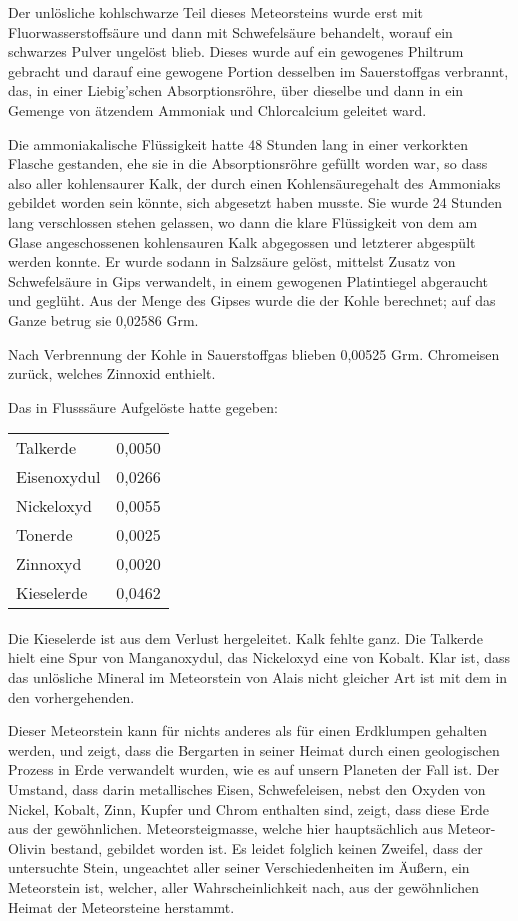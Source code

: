 \documentclass[a4paper, 11pt, oneside]{article}
\begin{document}
Der unlösliche kohlschwarze Teil dieses Meteorsteins wurde erst mit Fluorwasserstoffsäure und dann mit Schwefelsäure behandelt, worauf ein schwarzes Pulver ungelöst blieb. Dieses wurde auf ein gewogenes Philtrum gebracht und darauf eine gewogene Portion desselben im Sauerstoffgas verbrannt, das, in einer Liebig'schen Absorptionsröhre, über dieselbe und dann in ein Gemenge von ätzendem Ammoniak und Chlorcalcium geleitet ward.

Die ammoniakalische Flüssigkeit hatte 48 Stunden lang in einer verkorkten Flasche gestanden, ehe sie in die Absorptionsröhre gefüllt worden war, so dass also aller kohlensaurer Kalk, der durch einen Kohlensäuregehalt des Ammoniaks gebildet worden sein könnte, sich abgesetzt haben musste. Sie wurde 24 Stunden lang verschlossen stehen gelassen, wo dann die klare Flüssigkeit von dem am Glase angeschossenen kohlensauren Kalk abgegossen und letzterer abgespült werden konnte. Er wurde sodann in Salzsäure gelöst, mittelst Zusatz von Schwefelsäure in Gips verwandelt, in einem gewogenen Platintiegel abgeraucht und geglüht. Aus der Menge des Gipses wurde die der Kohle berechnet; auf das Ganze betrug sie 0,02586 Grm.

Nach Verbrennung der Kohle in Sauerstoffgas blieben 0,00525 Grm. Chromeisen zurück, welches Zinnoxid enthielt.

Das in Flusssäure Aufgelöste hatte gegeben:
\begin{center}
\begin{tabular}{ l r }
    Talkerde & 0,0050\\
    Eisenoxydul & 0,0266\\
    Nickeloxyd & 0,0055\\
    Tonerde & 0,0025\\
    Zinnoxyd & 0,0020\\
    Kieselerde & 0,0462\\
\end{tabular}
\end{center}
\paragraph{}
Die Kieselerde ist aus dem Verlust hergeleitet. Kalk fehlte ganz. Die Talkerde hielt eine Spur von Manganoxydul, das Nickeloxyd eine von Kobalt. Klar ist, dass das unlösliche Mineral im Meteorstein von Alais nicht gleicher Art ist mit dem in den vorhergehenden.

Dieser Meteorstein kann für nichts anderes als für einen Erdklumpen gehalten werden, und zeigt, dass die Bergarten in seiner Heimat durch einen geologischen Prozess in Erde verwandelt wurden, wie es auf unsern Planeten der Fall ist. Der Umstand, dass darin metallisches Eisen, Schwefeleisen, nebst den Oxyden von Nickel, Kobalt, Zinn, Kupfer und Chrom enthalten sind, zeigt, dass diese Erde aus der gewöhnlichen. Meteorsteigmasse, welche hier hauptsächlich aus Meteor-Olivin bestand, gebildet worden ist. Es leidet folglich keinen Zweifel, dass der untersuchte Stein, ungeachtet aller seiner Verschiedenheiten im Äußern, ein Meteorstein ist, welcher, aller Wahrscheinlichkeit nach, aus der gewöhnlichen Heimat der Meteorsteine herstammt.
\end{document}
